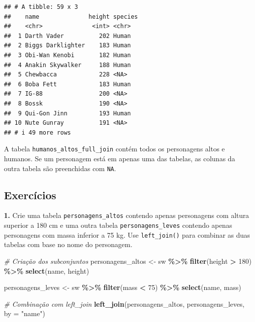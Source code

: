 \documentclass[
]{book}
\newenvironment{Shaded}{\begin{snugshade}}{\end{snugshade}}
\newcommand{\AttributeTok}[1]{\textcolor[rgb]{0.13,0.29,0.53}{#1}}
\newcommand{\CommentTok}[1]{\textcolor[rgb]{0.56,0.35,0.01}{\textit{#1}}}
\newcommand{\DecValTok}[1]{\textcolor[rgb]{0.00,0.00,0.81}{#1}}
\newcommand{\FunctionTok}[1]{\textcolor[rgb]{0.13,0.29,0.53}{\textbf{#1}}}
\newcommand{\NormalTok}[1]{#1}
\newcommand{\OtherTok}[1]{\textcolor[rgb]{0.56,0.35,0.01}{#1}}
\newcommand{\SpecialCharTok}[1]{\textcolor[rgb]{0.81,0.36,0.00}{\textbf{#1}}}
\newcommand{\StringTok}[1]{\textcolor[rgb]{0.31,0.60,0.02}{#1}}
\begin{document}
\begin{verbatim}
## # A tibble: 59 x 3
##    name              height species
##    <chr>              <int> <chr>  
##  1 Darth Vader          202 Human  
##  2 Biggs Darklighter    183 Human  
##  3 Obi-Wan Kenobi       182 Human  
##  4 Anakin Skywalker     188 Human  
##  5 Chewbacca            228 <NA>   
##  6 Boba Fett            183 Human  
##  7 IG-88                200 <NA>   
##  8 Bossk                190 <NA>   
##  9 Qui-Gon Jinn         193 Human  
## 10 Nute Gunray          191 <NA>   
## # i 49 more rows
\end{verbatim}

A tabela \texttt{humanos\_altos\_full\_join} contém todos os personagens altos e
humanos. Se um personagem está em apenas uma das tabelas, as colunas da
outra tabela são preenchidas com \texttt{NA}.

\subsection{Exercícios}\label{exercuxedcios-19}

\textbf{1.} Crie uma tabela \texttt{personagens\_altos} contendo apenas personagens
com altura superior a 180 cm e uma outra tabela \texttt{personagens\_leves}
contendo apenas personagens com massa inferior a 75 kg. Use
\texttt{left\_join()} para combinar as duas tabelas com base no nome do
personagem.

\begin{Shaded}
\begin{Highlighting}[]
\CommentTok{\# Criação dos subconjuntos}
\NormalTok{personagens\_altos }\OtherTok{\textless{}{-}}\NormalTok{ sw }\SpecialCharTok{\%\textgreater{}\%} 
  \FunctionTok{filter}\NormalTok{(height }\SpecialCharTok{\textgreater{}} \DecValTok{180}\NormalTok{) }\SpecialCharTok{\%\textgreater{}\%} 
  \FunctionTok{select}\NormalTok{(name, height)}

\NormalTok{personagens\_leves }\OtherTok{\textless{}{-}}\NormalTok{ sw }\SpecialCharTok{\%\textgreater{}\%} 
  \FunctionTok{filter}\NormalTok{(mass }\SpecialCharTok{\textless{}} \DecValTok{75}\NormalTok{) }\SpecialCharTok{\%\textgreater{}\%} 
  \FunctionTok{select}\NormalTok{(name, mass)}

\CommentTok{\# Combinação com left\_join}
\FunctionTok{left\_join}\NormalTok{(personagens\_altos, personagens\_leves, }\AttributeTok{by =} \StringTok{"name"}\NormalTok{)}
\end{Highlighting}
\end{Shaded}
\end{document}
